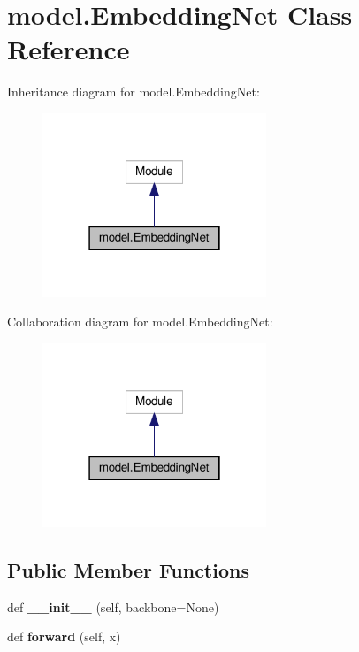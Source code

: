 \hypertarget{classmodel_1_1EmbeddingNet}{}\section{model.\+Embedding\+Net Class Reference}
\label{classmodel_1_1EmbeddingNet}


Inheritance diagram for model.\+Embedding\+Net\+:
\nopagebreak
\begin{figure}[H]
\begin{center}
\leavevmode
\includegraphics[width=190pt]{classmodel_1_1EmbeddingNet__inherit__graph}
\end{center}
\end{figure}


Collaboration diagram for model.\+Embedding\+Net\+:
\nopagebreak
\begin{figure}[H]
\begin{center}
\leavevmode
\includegraphics[width=190pt]{classmodel_1_1EmbeddingNet__coll__graph}
\end{center}
\end{figure}
\subsection*{Public Member Functions}
\begin{DoxyCompactItemize}
\item 
\mbox{\label{classmodel_1_1EmbeddingNet_a0688f1e95ed295813b13852a0d1f9f66}} 
def {\bfseries \+\_\+\+\_\+init\+\_\+\+\_\+} (self, backbone=None)
\item 
\mbox{\label{classmodel_1_1EmbeddingNet_a664ab770fa63006265ab4a6934aff985}} 
def {\bfseries forward} (self, x)
\end{DoxyCompactItemize}
